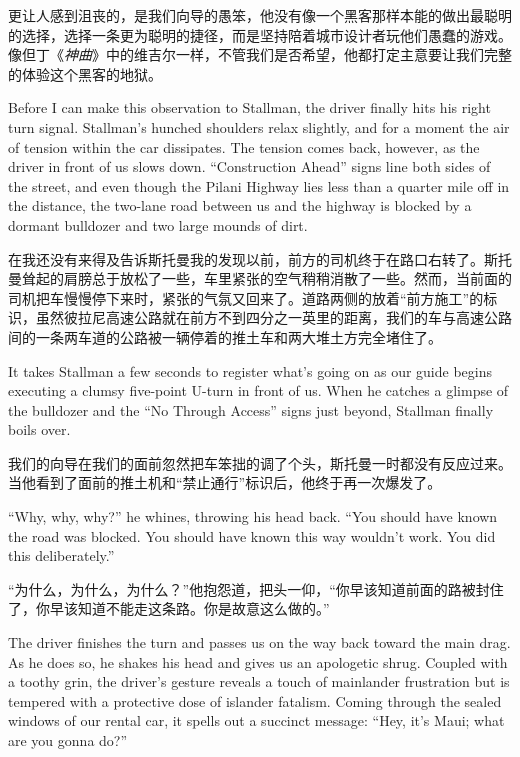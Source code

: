 \ifdefined\chs
更让人感到沮丧的，是我们向导的愚笨，他没有像一个黑客那样本能的做出最聪明的选择，选择一条更为聪明的捷径，而是坚持陪着城市设计者玩他们愚蠢的游戏。像但丁《\textit{神曲}》中的维吉尔一样，不管我们是否希望，他都打定主意要让我们完整的体验这个黑客的地狱。
\fi

\ifdefined\eng
Before I can make this observation to Stallman, the driver finally hits his right turn signal. Stallman's hunched shoulders relax slightly, and for a moment the air of tension within the car dissipates. The tension comes back, however, as the driver in front of us slows down. ``Construction Ahead'' signs line both sides of the street, and even though the Pilani Highway lies less than a quarter mile off in the distance, the two-lane road between us and the highway is blocked by a dormant bulldozer and two large mounds of dirt.
\fi

\ifdefined\chs
在我还没有来得及告诉斯托曼我的发现以前，前方的司机终于在路口右转了。斯托曼耸起的肩膀总于放松了一些，车里紧张的空气稍稍消散了一些。然而，当前面的司机把车慢慢停下来时，紧张的气氛又回来了。道路两侧的放着``前方施工''的标识，虽然彼拉尼高速公路就在前方不到四分之一英里的距离，我们的车与高速公路间的一条两车道的公路被一辆停着的推土车和两大堆土方完全堵住了。
\fi

\ifdefined\eng
It takes Stallman a few seconds to register what's going on as our guide begins executing a clumsy five-point U-turn in front of us. When he catches a glimpse of the bulldozer and the ``No Through Access'' signs just beyond, Stallman finally boils over.
\fi

\ifdefined\chs
我们的向导在我们的面前忽然把车笨拙的调了个头，斯托曼一时都没有反应过来。当他看到了面前的推土机和``禁止通行''标识后，他终于再一次爆发了。
\fi

\ifdefined\eng
``Why, why, why?'' he whines, throwing his head back. ``You should have known the road was blocked. You should have known this way wouldn't work. You did this deliberately.''  %
\fi

\ifdefined\chs
``为什么，为什么，为什么？''他抱怨道，把头一仰，``你早该知道前面的路被封住了，你早该知道不能走这条路。你是故意这么做的。'' %
\fi

\ifdefined\eng
The driver finishes the turn and passes us on the way back toward the main drag. As he does so, he shakes his head and gives us an apologetic shrug. Coupled with a toothy grin, the driver's gesture reveals a touch of mainlander frustration but is tempered with a protective dose of islander fatalism. Coming through the sealed windows of our rental car, it spells out a succinct message: ``Hey, it's Maui; what are you gonna do?''
\fi

